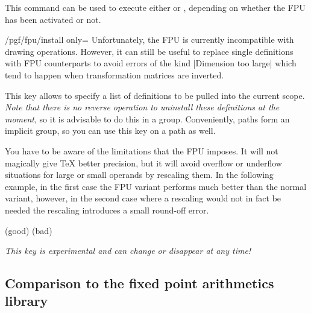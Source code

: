\begin{command}{\pgflibraryfpuifactive{}}
    This command can be used to execute either  or
    , depending on whether the FPU has been activated or not.
\end{command}

\begin{key}{/pgf/fpu/install only=}
    \label{fpu-install-only}
    Unfortunately, the FPU is currently incompatible with drawing operations.
    However, it can still be useful to replace single definitions with FPU
    counterparts to avoid errors of the kind |Dimension too large| which tend
    to happen when transformation matrices are inverted.

    This key allows to specify a list of definitions to be pulled into the
    current scope.  \emph{Note that there is no reverse operation to uninstall
    these definitions at the moment}, so it is advisable to do this in a group.
    Conveniently, \tikzname{} paths form an implicit group, so you can use this
    key on a path as well.

    You have to be aware of the limitations that the FPU imposes.  It will not
    magically give \TeX{} better precision, but it will avoid overflow or
    underflow situations for large or small operands by rescaling them.  In the
    following example, in the first case the FPU variant performs much better
    than the normal variant, however, in the second case where a rescaling
    would not in fact be needed the rescaling introduces a small round-off
    error.
\begin{codeexample}[
    preamble={\usepgflibrary{fpu}},
    pre={\pgfkeys{/pgf/fpu=false}},
]
\begingroup
{}
\pgfmathresult (good)
\pgfmathresult (bad)
\endgroup
\end{codeexample}
    \emph{This key is experimental and can change or disappear at any time!}
\end{key}


\subsection{Comparison to the fixed point arithmetics library}

